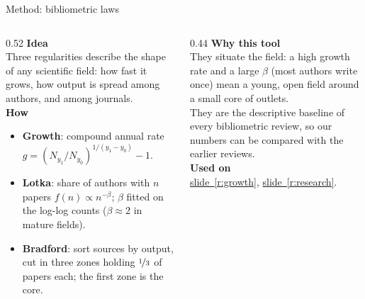 \documentclass[aspectratio=169,10pt]{beamer}
\newcommand{\usedon}[1]{\hyperref[#1]{\textcolor{c4}{slide~\ref*{#1}}}}
\newcommand{\mhead}[1]{\textcolor{c1}{\textbf{#1}}\\[1pt]}
\begin{document}
\begin{frame}{Method: bibliometric laws}
\begin{columns}[T]
\begin{column}{0.52\textwidth}\footnotesize
\mhead{Idea}
Three regularities describe the shape of any scientific field: how fast it grows, how output is spread among authors, and among journals.\\[4pt]
\mhead{How}
\begin{itemize}\setlength\itemsep{1pt}
\item \textbf{Growth}: compound annual rate $g = (N_{y_1}/N_{y_0})^{1/(y_1-y_0)} - 1$.
\item \textbf{Lotka}: share of authors with $n$ papers $f(n) \propto n^{-\beta}$; $\beta$ fitted on the log-log counts ($\beta \approx 2$ in mature fields).
\item \textbf{Bradford}: sort sources by output, cut in three zones holding $\nicefrac{1}{3}$ of papers each; the first zone is the core.
\end{itemize}
\end{column}
\begin{column}{0.44\textwidth}\footnotesize
\mhead{Why this tool}
They situate the field: a high growth rate and a large $\beta$ (most authors write once) mean a young, open field around a small core of outlets.\\[3pt]
They are the descriptive baseline of every bibliometric review, so our numbers can be compared with the earlier reviews.\\[6pt]
\mhead{Used on}
\usedon{r:growth}, \usedon{r:research}.
\end{column}
\end{columns}
\end{frame}
\end{document}

